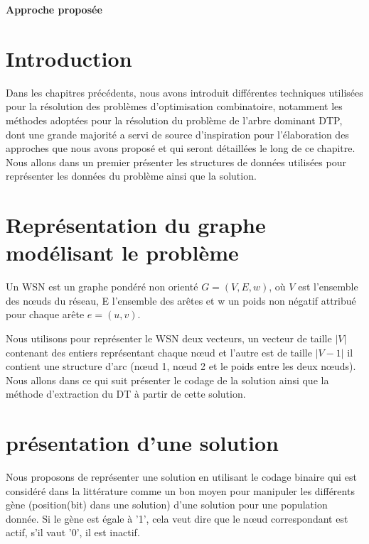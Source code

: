 \cleardoublepage


\setcounter{chapter}{4}
\setcounter{section}{0}
\setcounter{figure}{0}

\begin{center}
	\Huge\textbf{Approche proposée}
\end{center}

\section{Introduction}
Dans les chapitres précédents, nous avons introduit différentes techniques utilisées pour la résolution des problèmes d’optimisation combinatoire, notamment les méthodes adoptées pour la résolution du problème de l’arbre dominant DTP, dont une grande majorité a servi de source d’inspiration pour l’élaboration des approches que nous avons proposé et qui seront détaillées le long de ce chapitre.  Nous allons dans un premier présenter les structures de données utilisées pour représenter les données du problème ainsi que la solution.

\section{Représentation du graphe modélisant le problème}
Un WSN est un graphe pondéré non orienté $G=(V,E,w)$, où $V$ est l’ensemble des nœuds du réseau, E l’ensemble des arêtes et w un poids non négatif attribué pour chaque arête $e=(u,v)$. 

Nous utilisons pour représenter le WSN deux vecteurs, un vecteur de taille $|V|$ contenant des entiers représentant chaque nœud et l’autre est de taille $|V-1|$ il contient une structure d’arc (nœud 1, nœud 2 et le poids entre les deux nœuds). Nous allons dans ce qui suit présenter le codage de la solution ainsi que la méthode d'extraction du DT à partir de cette solution.


\section{présentation d’une solution}
Nous proposons de représenter une solution en utilisant le codage binaire qui est considéré dans la littérature comme un bon moyen pour manipuler les différents gène (position(bit) dans une solution) d’une solution pour une population donnée. Si le gène est égale à '1', cela veut dire que le nœud correspondant est actif, s'il vaut '0', il est inactif.


